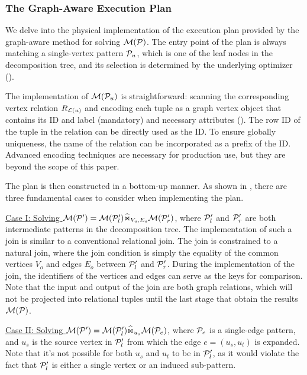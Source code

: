 \subsubsection{The Graph-Aware Execution Plan}
\label{sec:join-matching-operator}
We delve into the physical implementation of the execution plan provided by the graph-aware method for solving $\mathcal{M}(\mathcal{P})$. The entry point of the plan is always matching a single-vertex pattern $\mathcal{P}_u$, which is one of the leaf nodes in the decomposition tree, and its selection is determined by the underlying optimizer ().

 The implementation of $\mathcal{M}(\mathcal{P}_u)$ is straightforward: scanning the corresponding vertex relation ${R_{\mathcal{L}(u)}}$ and encoding each tuple as a graph vertex object that contains its ID and label (mandatory) and necessary attributes (). The row ID of the tuple in the relation can be directly used as the ID. To ensure globally uniqueness, the name of the relation can be incorporated as a prefix of the ID. Advanced encoding techniques are necessary for production use, but they are beyond the scope of this paper.

The plan is then constructed in a bottom-up manner. As shown in , there are three fundamental cases to consider when implementing the plan.

\underline{Case I: Solving $\mathcal{M}(\mathcal{P}') = \mathcal{M}(\mathcal{P}'_l) \widehat{\Join}_{V_o, E_o} \mathcal{M}(\mathcal{P}'_r)$}, where $\mathcal{P}_l'$ and $\mathcal{P}'_r$ are both intermediate patterns in the decomposition tree. The implementation of such a join is similar to a conventional relational join. The join is constrained to a natural join, where the join condition is simply the equality of the common vertices $V_o$ and edges $E_o$ between $\mathcal{P}_l'$ and $\mathcal{P}_r'$. During the implementation of the join, the identifiers of the vertices and edges can serve as the keys for comparison. Note that the input and output of the join are both graph relations, which will not
be projected into relational tuples until the last stage that obtain the results $\mathcal{M}(\mathcal{P})$.

\underline{Case II: Solving $\mathcal{M}(\mathcal{P}') = \mathcal{M}(\mathcal{P}'_l) \widehat{\Join}_{u_s} \mathcal{M}(\mathcal{P}_e)$}, where $\mathcal{P}_e$ is a single-edge pattern, and $u_s$ is the source vertex in $\mathcal{P}'_l$ from which the edge $e = (u_s, u_t)$ is expanded. Note that it's not possible for both $u_s$ and $u_t$ to be in $\mathcal{P}'_l$, as it would violate the fact that $\mathcal{P}'_l$ is either a single vertex or an induced sub-pattern.

